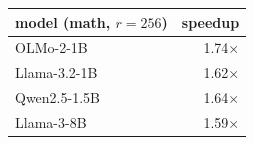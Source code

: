 \begin{tabular}{lr}
\toprule
model (math, $r{=}256$) & speedup \\
\midrule
OLMo-2-1B & 1.74$\times$ \\
Llama-3.2-1B & 1.62$\times$ \\
Qwen2.5-1.5B & 1.64$\times$ \\
Llama-3-8B & 1.59$\times$ \\
\bottomrule
\end{tabular}
